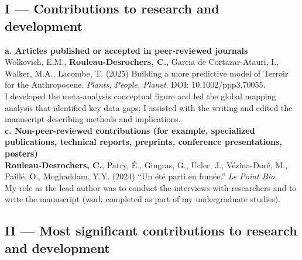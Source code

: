 \documentclass[12pt]{article}
\begin{document}
\subsection*{I --- Contributions to research and development}

\textbf{a. Articles published or accepted in peer-reviewed journals} \\[2pt]
Wolkovich, E.M., \textbf{Rouleau-Desrochers, C.}, Garcia de Cortazar-Atauri, I., Walker, M.A., Lacombe, T. (2025) Building a more predictive model of Terroir for the Anthropocene. \textit{Plants, People, Planet}. DOI: 10.1002/ppp3.70055.  \\
I developed the meta-analysis conceptual figure and led the global mapping analysis that identified key data gaps; I assisted with the writing and edited the manuscript describing methods and implications. \\[3pt]
\textbf{c. Non-peer-reviewed contributions (for example, specialized publications, technical reports, preprints, conference presentations, posters)} \\[2pt]
\textbf{Rouleau-Desrochers, C.}, Patry, É., Gingras, G., Ucler, J., Vézina-Doré, M., Paillé, O., Moghaddam, Y.Y. (2024) ``Un été parti en fumée.'' \textit{Le Point Bio}.  \\
My role as the lead author was to conduct the interviews with researchers and to write the manuscript (work completed as part of my undergraduate studies). 

\subsection*{II --- Most significant contributions to research and development}
\end{document}

